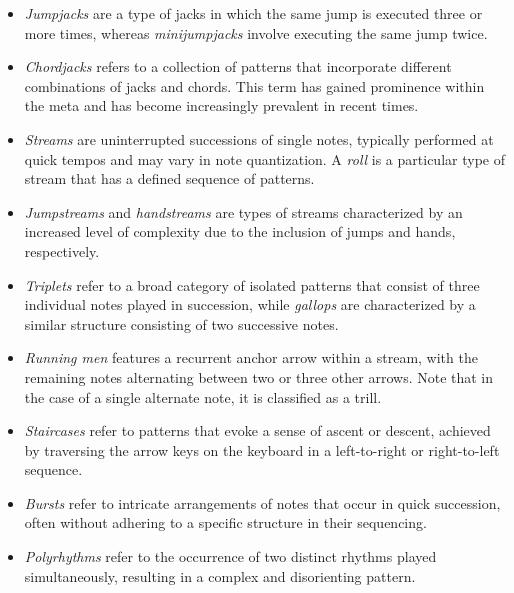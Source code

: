 \begin{itemize}
	\item \textit{Jumpjacks} are a type of jacks in which the same jump is executed three or more times, whereas \textit{minijumpjacks} involve executing the same jump twice. 
	      
	\item \textit{Chordjacks} refers to a collection of patterns that incorporate different combinations of jacks and chords. This term has gained prominence within the meta and has become increasingly prevalent in recent times. 
	      
	\item \textit{Streams} are uninterrupted successions of single notes, typically performed at quick tempos and may vary in note quantization. A \textit{roll} is a particular type of stream that has a defined sequence of patterns.
	      
	\item \textit{Jumpstreams} and \textit{handstreams} are types of streams characterized by an increased level of complexity due to the inclusion of jumps and hands, respectively.
	      
	\item \textit{Triplets} refer to a broad category of isolated patterns that consist of three individual notes played in succession, while \textit{gallops} are characterized by a similar structure consisting of two successive notes.
	      
	\item \textit{Running men} features a recurrent anchor arrow within a stream, with the remaining notes alternating between two or three other arrows. Note that in the case of a single alternate note, it is classified as a trill. 
	      
	\item \textit{Staircases} refer to patterns that evoke a sense of ascent or descent, achieved by traversing the arrow keys on the keyboard in a left-to-right or right-to-left sequence.
	      
	\item \textit{Bursts} refer to intricate arrangements of notes that occur in quick succession, often without adhering to a specific structure in their sequencing.
	      
	\item \textit{Polyrhythms} refer to the occurrence of two distinct rhythms played simultaneously, resulting in a complex and disorienting pattern.
\end{itemize}

